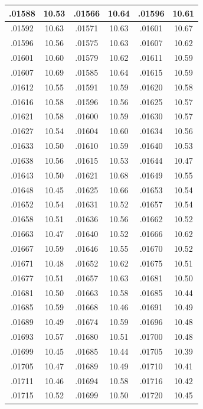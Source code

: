 \documentclass[11pt]{report}
\begin{document}
\begin{appendices}
\begin{longtable}{|c|c||c|c||c|c|}
.01588 & 10.53 & .01566 & 10.64 & .01596 & 10.61\\\hline
.01592 & 10.63 & .01571 & 10.63 & .01601 & 10.67\\\hline
.01596 & 10.56 & .01575 & 10.63 & .01607 & 10.62\\\hline
.01601 & 10.60 & .01579 & 10.62 & .01611 & 10.59\\\hline
.01607 & 10.69 & .01585 & 10.64 & .01615 & 10.59\\\hline
.01612 & 10.55 & .01591 & 10.59 & .01620 & 10.58\\\hline
.01616 & 10.58 & .01596 & 10.56 & .01625 & 10.57\\\hline
.01621 & 10.58 & .01600 & 10.59 & .01630 & 10.57\\\hline
.01627 & 10.54 & .01604 & 10.60 & .01634 & 10.56\\\hline
.01633 & 10.50 & .01610 & 10.59 & .01640 & 10.53\\\hline
.01638 & 10.56 & .01615 & 10.53 & .01644 & 10.47\\\hline
.01643 & 10.50 & .01621 & 10.68 & .01649 & 10.55\\\hline
.01648 & 10.45 & .01625 & 10.66 & .01653 & 10.54\\\hline
.01652 & 10.54 & .01631 & 10.52 & .01657 & 10.54\\\hline
.01658 & 10.51 & .01636 & 10.56 & .01662 & 10.52\\\hline
.01663 & 10.47 & .01640 & 10.52 & .01666 & 10.62\\\hline
.01667 & 10.59 & .01646 & 10.55 & .01670 & 10.52\\\hline
.01671 & 10.48 & .01652 & 10.62 & .01675 & 10.51\\\hline
.01677 & 10.51 & .01657 & 10.63 & .01681 & 10.50\\\hline
.01681 & 10.50 & .01663 & 10.58 & .01685 & 10.44\\\hline
.01685 & 10.59 & .01668 & 10.46 & .01691 & 10.49\\\hline
.01689 & 10.49 & .01674 & 10.59 & .01696 & 10.48\\\hline
.01693 & 10.57 & .01680 & 10.51 & .01700 & 10.48\\\hline
.01699 & 10.45 & .01685 & 10.44 & .01705 & 10.39\\\hline
.01705 & 10.47 & .01689 & 10.49 & .01710 & 10.41\\\hline
.01711 & 10.46 & .01694 & 10.58 & .01716 & 10.42\\\hline
.01715 & 10.52 & .01699 & 10.50 & .01720 & 10.45\\\hline

\end{longtable}
\end{appendices}
\end{document}
